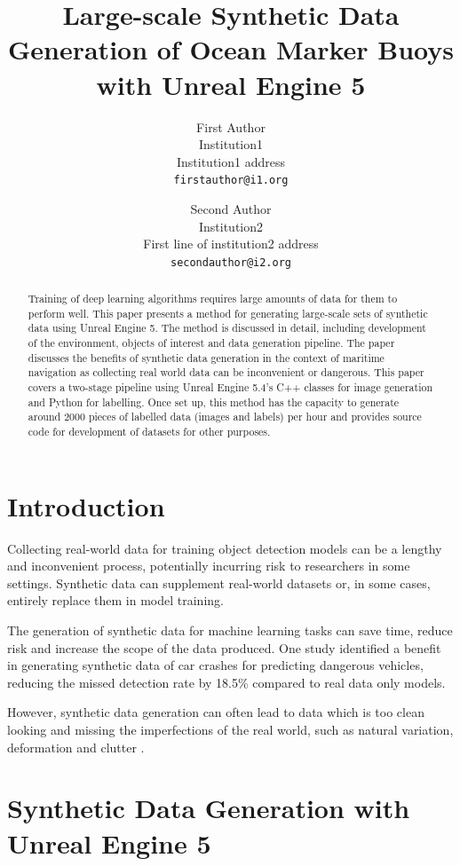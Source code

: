 \documentclass[10pt,twocolumn,letterpaper]{article}
\title{Large-scale Synthetic Data Generation of Ocean Marker Buoys with Unreal Engine 5}
\author{First Author\\
Institution1\\
Institution1 address\\
{\tt\small firstauthor@i1.org}
\and
Second Author\\
Institution2\\
First line of institution2 address\\
{\tt\small secondauthor@i2.org}
}
\begin{document}
\maketitle

\begin{abstract}
    Training of deep learning algorithms requires large amounts of data for them to perform well. This paper presents a method for generating large-scale sets of synthetic data using Unreal Engine 5. The method is discussed in detail, including development of the environment, objects of interest and data generation pipeline. The paper discusses the benefits of synthetic data generation in the context of maritime navigation as collecting real world data can be inconvenient or dangerous. This paper covers a two-stage pipeline using Unreal Engine 5.4's C++ classes for image generation and Python for labelling. Once set up, this method has the capacity to generate around 2000 pieces of labelled data (images and labels) per hour and provides source code for development of datasets for other purposes.
    \end{abstract}

\section{Introduction}

Collecting real-world data for training object detection models can be a lengthy and inconvenient process, potentially incurring risk to researchers in some settings. Synthetic data can supplement real-world datasets or, in some cases, entirely replace them in model training.

The generation of synthetic data for machine learning tasks can save time, reduce risk and increase the scope of the data produced. One study identified a benefit in generating synthetic data of car crashes for predicting dangerous vehicles, reducing the missed detection rate by 18.5\% compared to real data only models. \cite{Kim_Lee_Hwang_Suh_2019} 

However, synthetic data generation can often lead to data which is too clean looking and missing the imperfections of the real world, such as natural variation, deformation and clutter \cite{Feng_2024_CVPR}. 

\section{Synthetic Data Generation with Unreal Engine 5}
\end{document}
